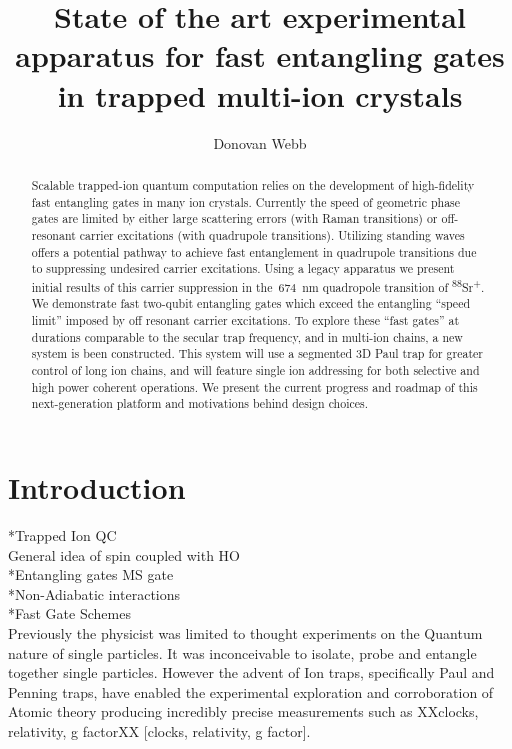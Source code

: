 \documentclass[12pt]{iopart}
\begin{document}
\title[]{State of the art experimental apparatus for fast entangling gates in trapped multi-ion crystals}

\author{Donovan Webb}

\address{Department of Physics,
University of Oxford}

\begin{abstract}

    Scalable trapped-ion quantum computation relies on the development
    of high-fidelity fast entangling gates in many ion crystals.
    Currently the speed of geometric phase gates are limited by either large
    scattering errors (with Raman transitions) or off-resonant carrier
    excitations (with quadrupole transitions).
    Utilizing standing waves offers a potential pathway to achieve
    fast entanglement in quadrupole transitions due to suppressing
    undesired carrier excitations.
    Using a legacy apparatus we present initial results of this
    carrier suppression in the~$674$~nm quadropole transition of
    \textsuperscript{88}Sr\textsuperscript{+}. We demonstrate
    fast two-qubit entangling gates which exceed the entangling ``speed
    limit'' imposed by off resonant carrier excitations.
    To explore these ``fast gates'' at durations comparable to the
    secular trap frequency, and in multi-ion chains, a new system is
    been constructed. This system will use a segmented 3D Paul trap
    for greater control of long ion chains, and will feature single
    ion addressing for both selective and high power coherent
    operations.  We present the current progress and roadmap of this
    next-generation platform and motivations behind design choices.

\end{abstract}

\section{Introduction}

    *Trapped Ion QC\\
    General idea of spin coupled with HO\\
    *Entangling gates MS gate \\
    *Non-Adiabatic interactions \\
    *Fast Gate Schemes \\

Previously the physicist was limited to thought experiments on the
Quantum nature of single particles. It was inconceivable to isolate,
probe and entangle together single particles. However the advent of
Ion traps, specifically Paul and Penning traps, have enabled the
experimental exploration and corroboration of Atomic theory producing
incredibly precise measurements such as XXclocks, relativity, g
factorXX [clocks, relativity, g factor].
\end{document}
